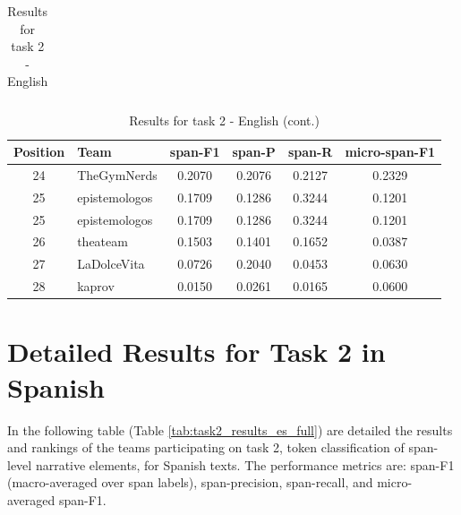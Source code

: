 \documentclass{Configuration_Files/PoliMi3i_thesis}
\begin{document}
\begin{table}[H]
\begin{tabular}{clcccc}
\hline
\end{tabular}
\caption{\small Results for task 2 - English \cite{korencic2024oppositional}}
\label{tab:task2_results_en_full}
\end{table}
\FloatBarrier

\begin{table}[H]
\ContinuedFloat
\centering
\small
\renewcommand{\arraystretch}{0.8} %
\begin{tabular}{clcccc}
\hline
\textbf{Position} & \textbf{Team} & \textbf{span-F1} & \textbf{span-P} & \textbf{span-R} & \textbf{micro-span-F1} \\ \hline
24 & TheGymNerds & 0.2070 & 0.2076 & 0.2127 & 0.2329 \\
25 & epistemologos & 0.1709 & 0.1286 & 0.3244 & 0.1201 \\
25 & epistemologos & 0.1709 & 0.1286 & 0.3244 & 0.1201 \\
26 & theateam & 0.1503 & 0.1401 & 0.1652 & 0.0387 \\
27 & LaDolceVita & 0.0726 & 0.2040 & 0.0453 & 0.0630 \\
28 & kaprov & 0.0150 & 0.0261 & 0.0165 & 0.0600 \\
\hline
\end{tabular}
\caption{Results for task 2 - English (cont.) \cite{korencic2024oppositional}}
\label{tab:task2_results_en_full}
\end{table}
\FloatBarrier

\section{Detailed Results for Task 2 in Spanish}
In the following table (Table \ref{tab:task2_results_es_full}) are detailed the results and rankings of the teams participating on task 2, token classification of span-level narrative elements, for Spanish texts. The performance metrics are: span-F1 (macro-averaged over span labels), span-precision, span-recall, and micro-averaged span-F1.
\end{document}
